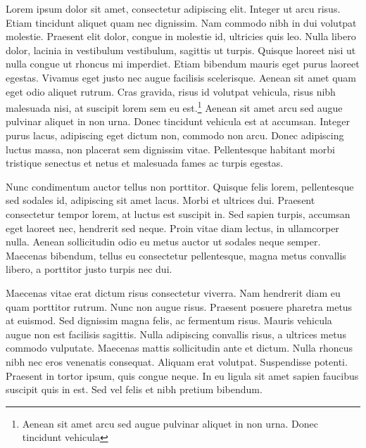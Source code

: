 
\noindent
Lorem ipsum dolor sit amet, consectetur adipiscing elit.\citep{Nacuzzi:2007} Integer ut arcu risus. Etiam tincidunt aliquet quam nec dignissim. Nam commodo nibh in dui volutpat molestie. Praesent elit dolor, congue in molestie id, ultricies quis leo. Nulla libero dolor, lacinia in vestibulum vestibulum, sagittis ut turpis. Quisque laoreet nisi ut nulla congue ut rhoncus mi imperdiet. Etiam bibendum mauris eget purus laoreet egestas.\citep{Cooper:1939} Vivamus eget justo nec augue facilisis scelerisque. Aenean sit amet quam eget odio aliquet rutrum. Cras gravida, risus id volutpat vehicula, risus nibh malesuada nisi, at suscipit lorem sem eu est.\footnote{Aenean sit amet arcu sed augue pulvinar aliquet in non urna. Donec tincidunt vehicula} Aenean sit amet arcu sed augue pulvinar aliquet in non urna. Donec tincidunt vehicula est at accumsan. Integer purus lacus, adipiscing eget dictum non, commodo non arcu. Donec adipiscing luctus massa, non placerat sem dignissim vitae. Pellentesque habitant morbi tristique senectus et netus et malesuada fames ac turpis egestas.\citep{Fernandez:1892,carlin2010linguistics}

Nunc condimentum auctor tellus non porttitor.\citep{Febre:2005,algonquina:wigwams:online} Quisque felis lorem, pellentesque sed sodales id, adipiscing sit amet lacus. Morbi et ultrices dui. Praesent consectetur tempor lorem, at luctus est suscipit in. Sed sapien turpis, accumsan eget laoreet nec, hendrerit sed neque. Proin vitae diam lectus, in ullamcorper nulla.\citep{Sultzman:1999} Aenean sollicitudin odio eu metus auctor ut sodales neque semper. Maecenas bibendum, tellus eu consectetur pellentesque, magna metus convallis libero, a porttitor justo turpis nec dui.\citep{Britannica:Tehuelche:Online,Guia:Patagonia}

\lbpsepline

Maecenas vitae erat dictum risus consectetur viverra. Nam hendrerit diam eu quam porttitor rutrum. Nunc non augue risus. Praesent posuere pharetra metus at euismod. Sed dignissim magna felis, ac fermentum risus.\citep{Advent:2009} Mauris vehicula augue non est facilisis sagittis. Nulla adipiscing convallis risus, a ultrices metus commodo vulputate. Maecenas mattis sollicitudin ante et dictum. Nulla rhoncus nibh nec eros venenatis consequat. Aliquam erat volutpat.\citep{algonquina:lengua:online} Suspendisse potenti. Praesent in tortor ipsum, quis congue neque. In eu ligula sit amet sapien faucibus suscipit quis in est. Sed vel felis et nibh pretium bibendum.

